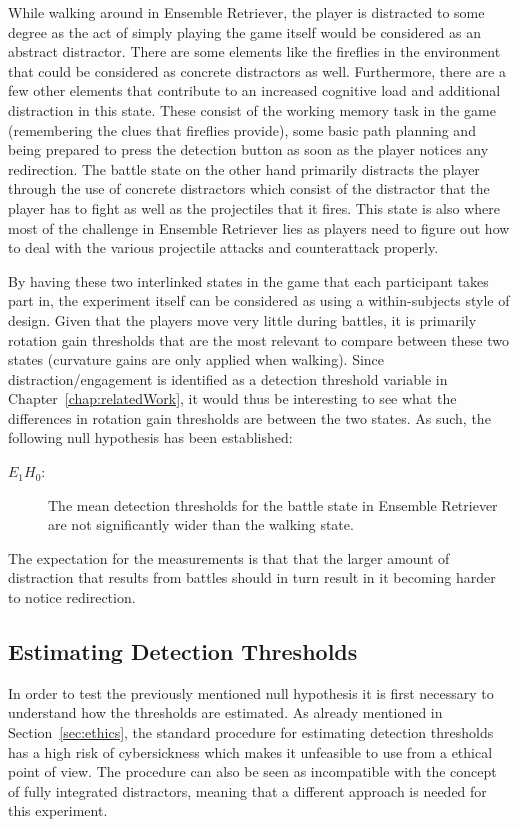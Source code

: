 While walking around in Ensemble Retriever, the player is distracted to some degree as the act of simply playing the game itself would be considered as an abstract distractor. There are some elements like the fireflies in the environment that could be considered as concrete distractors as well. Furthermore, there are a few other elements that contribute to an increased cognitive load and additional distraction in this state. These consist of the working memory task in the game (remembering the clues that fireflies provide), some basic path planning and being prepared to press the detection button as soon as the player notices any redirection. The battle state on the other hand primarily distracts the player through the use of concrete distractors which consist of the distractor that the player has to fight as well as the projectiles that it fires. This state is also where most of the challenge in Ensemble Retriever lies as players need to figure out how to deal with the various projectile attacks and counterattack properly. 

By having these two interlinked states in the game that each participant takes part in, the experiment itself can be considered as using a within-subjects style of design. Given that the players move very little during battles, it is primarily rotation gain thresholds that are the most relevant to compare between these two states (curvature gains are only applied when walking). Since distraction/engagement is identified as a detection threshold variable in Chapter~\ref{chap:relatedWork}, it would thus be interesting to see what the differences in rotation gain thresholds are between the two states. As such, the following null hypothesis has been established:

\begin{description}
\item[$E_1H_0$: ] The mean detection thresholds for the battle state in Ensemble Retriever are not significantly wider than the walking state.
\end{description}

The expectation for the measurements is that that the larger amount of distraction that results from battles should in turn result in it becoming harder to notice redirection. 

\subsection{Estimating Detection Thresholds}\label{sec:ex1EstimationMethod}
In order to test the previously mentioned null hypothesis it is first necessary to understand how the thresholds are estimated. As already mentioned in Section~\ref{sec:ethics}, the standard procedure for estimating detection thresholds has a high risk of cybersickness which makes it unfeasible to use from a ethical point of view. The procedure can also be seen as incompatible with the concept of fully integrated distractors, meaning that a different approach is needed for this experiment.  

